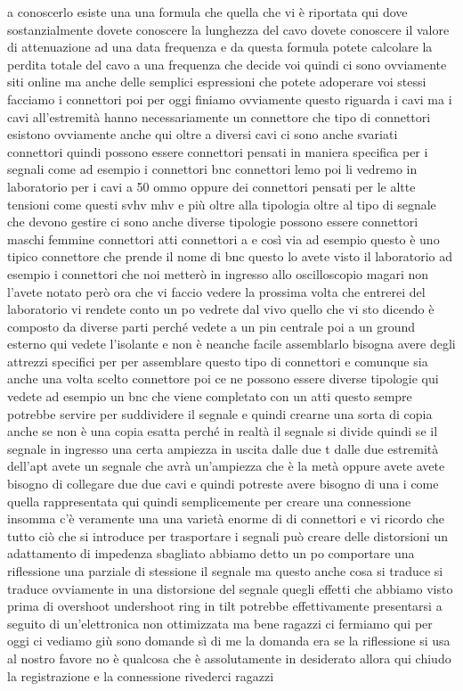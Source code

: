 {a conoscerlo esiste una una formula che quella che vi è riportata qui dove sostanzialmente dovete conoscere la lunghezza del cavo dovete conoscere il valore di attenuazione ad una data frequenza e da questa formula potete calcolare la perdita totale del cavo a una frequenza che decide voi quindi ci sono ovviamente siti online ma anche delle semplici espressioni che potete adoperare voi stessi facciamo i connettori poi per oggi finiamo ovviamente questo riguarda i cavi ma i cavi all'estremità hanno necessariamente un connettore che tipo di connettori esistono ovviamente anche qui oltre a diversi cavi ci sono anche svariati connettori quindi possono essere connettori pensati in maniera specifica per i segnali come ad esempio i connettori bnc connettori lemo poi li vedremo in laboratorio per i cavi a 50 ommo oppure dei connettori pensati per le altte tensioni come questi svhv mhv e più oltre alla tipologia oltre al tipo di segnale che devono gestire ci sono anche diverse tipologie possono essere connettori maschi femmine connettori atti connettori a e così via ad esempio questo è uno tipico connettore che prende il nome di bnc questo lo avete visto il laboratorio ad esempio i connettori che noi metterò in ingresso allo oscilloscopio magari non l'avete notato però ora che vi faccio vedere la prossima volta che entrerei del laboratorio vi rendete conto un po vedrete dal vivo quello che vi sto dicendo è composto da diverse parti perché vedete a un pin centrale poi a un ground esterno qui vedete l'isolante e non è neanche facile assemblarlo bisogna avere degli attrezzi specifici per per assemblare questo tipo di connettori e comunque sia anche una volta scelto connettore poi ce ne possono essere diverse tipologie qui vedete ad esempio un bnc che viene completato con un atti questo sempre potrebbe servire per suddividere il segnale e quindi crearne una sorta di copia anche se non è una copia esatta perché in realtà il segnale si divide quindi se il segnale in ingresso una certa ampiezza in uscita dalle due t dalle due estremità dell'apt avete un segnale che avrà un'ampiezza che è la metà oppure avete avete bisogno di collegare due due cavi e quindi potreste avere bisogno di una i come quella rappresentata qui quindi semplicemente per creare una connessione insomma c'è veramente una una varietà enorme di di connettori e vi ricordo che tutto ciò che si introduce per trasportare i segnali può creare delle distorsioni un adattamento di impedenza sbagliato abbiamo detto un po comportare una riflessione una parziale di stessione il segnale ma questo anche cosa si traduce si traduce ovviamente in una distorsione del segnale quegli effetti che abbiamo visto prima di overshoot undershoot ring in tilt potrebbe effettivamente presentarsi a seguito di un'elettronica non ottimizzata ma bene ragazzi ci fermiamo qui per oggi ci vediamo giù sono domande sì di me la domanda era se la riflessione si usa al nostro favore no è qualcosa che è assolutamente in desiderato allora qui chiudo la registrazione e la connessione rivederci ragazzi

}
